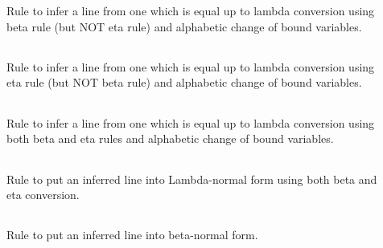 \begin{description} 

\item[\parbox{\textwidth}{BETA*}] \label{BETA*}
Rule to infer a line from one which is equal up to lambda conversion
using beta rule (but NOT eta rule) and alphabetic change of bound variables.\\
\texttt{ }


\item[\parbox{\textwidth}{ETA*}] \label{ETA*}
Rule to infer a line from one which is equal up to lambda conversion
using eta rule (but NOT beta rule) and alphabetic change of bound variables.\\
\texttt{ }


\item[\parbox{\textwidth}{LAMBDA*}] \label{LAMBDA*}
Rule to infer a line from one which is equal up to lambda conversion
using both beta and eta rules and alphabetic change of bound variables.\\
\texttt{ }


\item[\parbox{\textwidth}{LCONTR*}] \label{LCONTR*}
Rule to put an inferred line into Lambda-normal form using both 
beta and eta conversion.\\
\texttt{ }


\item[\parbox{\textwidth}{LCONTR*-BETA}] \label{LCONTR*-BETA}
Rule to put an inferred line into beta-normal form.\\
\texttt{ }



\end{description}
